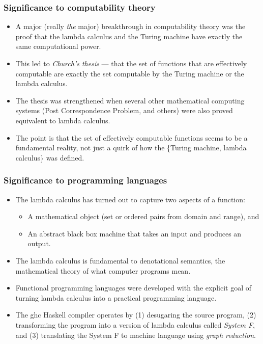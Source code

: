 \documentclass{beamer}
\begin{document}
\begin{frame}[fragile]
\frametitle{Significance to computability theory}

\begin{itemize}
\item A major (really \emph{the} major) breakthrough in
  computability theory was the proof that the lambda calculus and
  the Turing machine have exactly the same computational power.
\item This led to \emph{Church's thesis} --- that the set of
  functions that are effectively computable are exactly the set
  computable by the Turing machine or the lambda calculus.
\item The thesis was strengthened when several other mathematical
  computing systems (Post Correspondence Problem, and others) were
  also proved equivalent to lambda calculus.
\item The point is that the set of effectively computable functions
  seems to be a fundamental reality, not just a quirk of how the
  \{Turing machine, lambda calculus\} was defined.
\end{itemize}

\end{frame}

\begin{frame}[fragile]
\frametitle{Significance to programming languages}

\begin{itemize}
\item The lambda calculus has turned out to capture two aspects of
  a function:
  \begin{itemize}
  \item A mathematical object (set or ordered pairs from domain and
    range), and
  \item An abstract black box machine that takes an input and
    produces an output.
  \end{itemize}
\item The lambda calculus is fundamental to denotational semantics,
  the mathematical theory of what computer programs mean.
\item Functional programming languages were developed with the
  explicit goal of turning lambda calculus into a practical
  programming language.
\item The ghc Haskell compiler operates by (1) desugaring the
  source program, (2) transforming the program into a version of
  lambda calculus called \emph{System F}, and (3) translating the
  System F to machine language using \emph{graph reduction}.
\end{itemize}

\end{frame}
\end{document}
